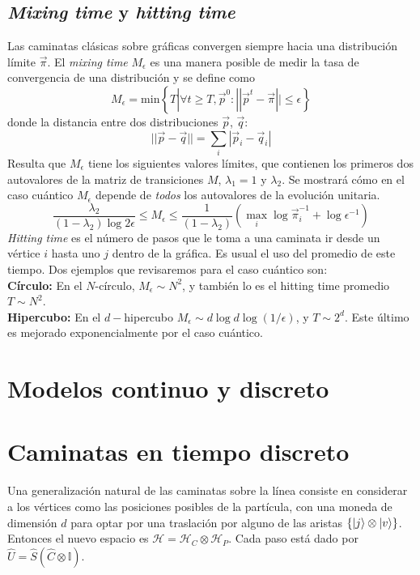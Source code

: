 \subsection{\textit{Mixing time} y \textit{hitting time}}

\cite{shao} Las caminatas clásicas sobre gráficas convergen siempre hacia una distribución límite $\Vec{\pi}$. El \textit{mixing time} $M_\epsilon$ es una manera posible de medir la tasa de convergencia de una distribución y se define como
\begin{equation*}
    M_\epsilon=\text{min}\left\{T|\forall t \geq T,\Vec{p}^0:||\Vec{p}^{t}-\Vec{\pi}||\leq\epsilon\right\}
\end{equation*}{}
donde la distancia entre dos distribuciones $\Vec{p}$, $\Vec{q}$:
\begin{equation}
    ||\Vec{p}-\Vec{q}||=\sum_i|\Vec{p}_i-\Vec{q}_i|
\end{equation}{}
Resulta que $M_\epsilon$ tiene los siguientes valores límites, que contienen los primeros dos autovalores de la matriz de transiciones $M$, $\lambda_1=1$ y $\lambda_2$. Se mostrará cómo en el caso cuántico $M_\epsilon$ depende de \textit{todos} los autovalores de la evolución unitaria.
\begin{equation*}{}
\dfrac{\lambda_2}{(1-\lambda_2)\log2\epsilon}\leq M_\epsilon\leq\dfrac{1}{(1-\lambda_2)}(\max_i\log\Vec{\pi}_i^{-1}+\log\epsilon^{-1})
\end{equation*}
\textit{Hitting time} es el número de pasos que le toma a una caminata ir desde un vértice $i$ hasta uno $j$ dentro de la gráfica. Es usual el uso del promedio de este tiempo. Dos ejemplos que revisaremos para el caso cuántico son:\\
\textbf{Círculo:} En el $N$-círculo, $M_\epsilon\sim N^2$, y también lo es el hitting time promedio $T\sim N^2$.\\
\textbf{Hipercubo:} En el $d-$hipercubo $M_\epsilon\sim d\log d\log (1/\epsilon)$, y 
$T\sim 2^d$. Este último es mejorado exponencialmente por el caso cuántico.

\section{Modelos continuo y discreto}

\section{Caminatas en tiempo discreto}
Una generalización natural de las caminatas sobre la línea consiste en considerar a los vértices como las posiciones posibles de la partícula, con una moneda de dimensión $d$ para optar por una traslación por alguno de las aristas $\left\{\ket{j}\otimes\ket{v}\right\}$. Entonces el nuevo espacio es $\mathcal{H}=\mathcal{H}_C\otimes\mathcal{H}_P$. Cada paso está dado por $\hat{U}=\hat{S}(\hat{C}\otimes\mathbb{I})$. 

